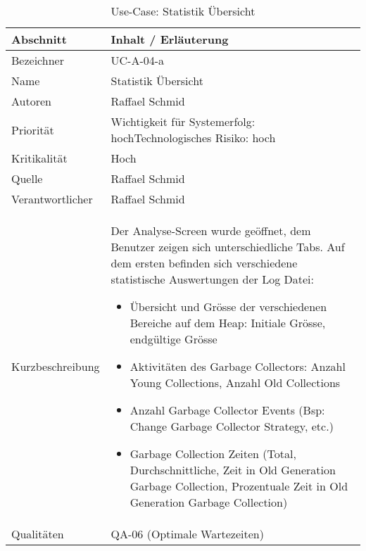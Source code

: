 \begin{longtable}{|p{4cm}|p{10.5cm}|}
\caption{Use-Case: Statistik Übersicht}\\\hline
   \textbf{Abschnitt} & \textbf{Inhalt / Erläuterung} \\\hline
   Bezeichner & UC-A-04-a\\\hline
   Name & Statistik Übersicht\\\hline
   Autoren & Raffael Schmid\\\hline
   Priorität & Wichtigkeit für Systemerfolg: hoch\newline Technologisches Risiko: hoch\\\hline
   Kritikalität & Hoch\\\hline
   Quelle & Raffael Schmid\\\hline
   Verantwortlicher & Raffael Schmid\\\hline
   Kurzbeschreibung & Der Analyse-Screen wurde geöffnet, dem Benutzer zeigen sich unterschiedliche Tabs. Auf dem ersten befinden sich verschiedene statistische Auswertungen der Log Datei:
   \begin{itemize}
	\item Übersicht und Grösse der verschiedenen Bereiche auf dem Heap: Initiale Grösse, endgültige Grösse
	\item Aktivitäten des Garbage Collectors: Anzahl Young Collections, Anzahl Old Collections
	\item Anzahl Garbage Collector Events (Bsp: Change Garbage Collector Strategy, etc.)
	\item Garbage Collection Zeiten (Total, Durchschnittliche, Zeit in Old Generation Garbage Collection, Prozentuale Zeit in Old Generation Garbage Collection)
   \end{itemize}
 \\\hline
   Qualitäten & QA-06 (Optimale Wartezeiten)\\\hline
\end{longtable}

